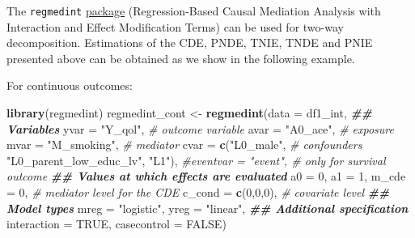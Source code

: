 \documentclass[
]{book}
\newenvironment{Shaded}{\begin{snugshade}}{\end{snugshade}}
\newcommand{\AttributeTok}[1]{\textcolor[rgb]{0.13,0.29,0.53}{#1}}
\newcommand{\CommentTok}[1]{\textcolor[rgb]{0.56,0.35,0.01}{\textit{#1}}}
\newcommand{\ConstantTok}[1]{\textcolor[rgb]{0.56,0.35,0.01}{#1}}
\newcommand{\DecValTok}[1]{\textcolor[rgb]{0.00,0.00,0.81}{#1}}
\newcommand{\DocumentationTok}[1]{\textcolor[rgb]{0.56,0.35,0.01}{\textbf{\textit{#1}}}}
\newcommand{\FunctionTok}[1]{\textcolor[rgb]{0.13,0.29,0.53}{\textbf{#1}}}
\newcommand{\NormalTok}[1]{#1}
\newcommand{\OtherTok}[1]{\textcolor[rgb]{0.56,0.35,0.01}{#1}}
\newcommand{\StringTok}[1]{\textcolor[rgb]{0.31,0.60,0.02}{#1}}
\begin{document}
The \texttt{regmedint} \href{https://cran.r-project.org/web/packages/regmedint/index.html}{package} (Regression-Based Causal Mediation Analysis with Interaction and Effect Modification Terms) can be used for two-way decomposition. Estimations of the CDE, PNDE, TNIE, TNDE and PNIE presented above can be obtained as we show in the following example.

For continuous outcomes:

\begin{Shaded}
\begin{Highlighting}[]
\FunctionTok{library}\NormalTok{(regmedint)}
\NormalTok{regmedint\_cont }\OtherTok{\textless{}{-}} \FunctionTok{regmedint}\NormalTok{(}\AttributeTok{data =}\NormalTok{ df1\_int,}
                            \DocumentationTok{\#\# Variables}
                            \AttributeTok{yvar =} \StringTok{"Y\_qol"}\NormalTok{,                   }\CommentTok{\# outcome variable}
                            \AttributeTok{avar =} \StringTok{"A0\_ace"}\NormalTok{,                  }\CommentTok{\# exposure}
                            \AttributeTok{mvar =} \StringTok{"M\_smoking"}\NormalTok{,               }\CommentTok{\# mediator}
                            \AttributeTok{cvar =} \FunctionTok{c}\NormalTok{(}\StringTok{"L0\_male"}\NormalTok{,               }\CommentTok{\# confounders}
                                     \StringTok{"L0\_parent\_low\_educ\_lv"}\NormalTok{,}
                                     \StringTok{"L1"}\NormalTok{),}
                            \CommentTok{\#eventvar = "event",     \# only for survival outcome}
                            \DocumentationTok{\#\# Values at which effects are evaluated}
                            \AttributeTok{a0 =} \DecValTok{0}\NormalTok{,}
                            \AttributeTok{a1 =} \DecValTok{1}\NormalTok{,}
                            \AttributeTok{m\_cde =} \DecValTok{0}\NormalTok{,              }\CommentTok{\# mediator level for the CDE}
                            \AttributeTok{c\_cond =} \FunctionTok{c}\NormalTok{(}\DecValTok{0}\NormalTok{,}\DecValTok{0}\NormalTok{,}\DecValTok{0}\NormalTok{),                 }\CommentTok{\# covariate level}
                            \DocumentationTok{\#\# Model types}
                            \AttributeTok{mreg =} \StringTok{"logistic"}\NormalTok{,}
                            \AttributeTok{yreg =} \StringTok{"linear"}\NormalTok{,}
                            \DocumentationTok{\#\# Additional specification}
                            \AttributeTok{interaction =} \ConstantTok{TRUE}\NormalTok{,}
                            \AttributeTok{casecontrol =} \ConstantTok{FALSE}\NormalTok{)}

\end{Highlighting}
\end{Shaded}
\end{document}
